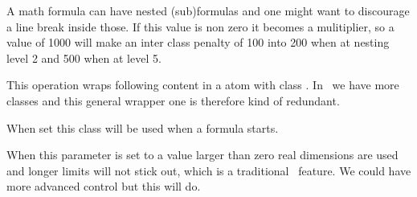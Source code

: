 \startnewprimitive[title={\prm {mathinlinepenaltyfactor}}]

A math formula can have nested (sub)formulas and one might want to discourage a
line break inside those. If this value is non zero it becomes a mulitiplier, so a
value of 1000 will make an inter class penalty of 100 into 200 when at nesting
level 2 and 500 when at level 5.

\stopnewprimitive

\startoldprimitive[title={\prm {mathinner}}]

This operation wraps following content in a atom with class . In
\LUAMETATEX\ we have more classes and this general wrapper one is therefore kind
of redundant.

\stopoldprimitive

\startnewprimitive[title={\prm {mathleftclass}}]

When set this class will be used when a formula starts.

\stopnewprimitive

\startnewprimitive[title={\prm {mathlimitsmode}}]

When this parameter is set to a value larger than zero real dimensions are used
and longer limits will not stick out, which is a traditional \TEX\ feature. We
could have more advanced control but this will do.

\startbuffer
\dontleavehmode
{}
\blank
\dontleavehmode
{}
\blank
\dontleavehmode
{}
\stopbuffer

